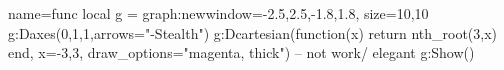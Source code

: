 \documentclass{standalone}
\begin{document}
\begin{luadraw}{name=func}
    local g = graph:new{window={-2.5,2.5,-1.8,1.8}, size={10,10}}
    g:Daxes({0,1,1},{arrows="-Stealth"})
    g:Dcartesian(function(x) return nth_root(3,x) end, {x={-3,3},  draw_options="magenta, thick"}) -- not work/ elegant
    g:Show()
\end{luadraw}
\end{document}
